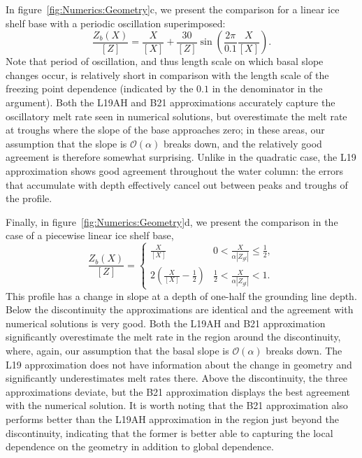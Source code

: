 \documentclass[openacc]{rsproca_new}%
\newcommand{\order}[1]{\mathcal{O}(#1)}
\begin{document}
In figure~\ref{fig:Numerics:Geometry}c, we present the comparison for a linear ice shelf base with a periodic oscillation superimposed:
\begin{equation}\label{E:Numerics:SinusoidalGeometry}
\frac{Z_b(X)}{\left[Z\right]}= \frac{X}{\left[X\right]} + \frac{30}{\left[Z\right]}\sin\left(\frac{2\pi}{0.1}\frac{ X}{\left[X\right]}\right).
\end{equation}
Note that period of oscillation, and thus length scale on which basal slope changes occur, is relatively short in comparison with the length scale of the freezing point dependence (indicated by the $0.1$ in the denominator in the argument). Both the L19AH and B21 approximations accurately capture the oscillatory melt rate seen in numerical solutions, but overestimate the melt rate at troughs where the slope of the base approaches zero; in these areas, our assumption that the slope is $\order{\alpha}$ breaks down, and the relatively good agreement is therefore somewhat surprising. Unlike in the quadratic case, the L19 approximation shows good agreement throughout the water column: the errors that accumulate with depth effectively cancel out between peaks and troughs of the profile.  

Finally, in figure~\ref{fig:Numerics:Geometry}d, we present the comparison in the case of a piecewise linear ice shelf base,
\begin{equation}\label{E:Numerics:PiecewiseGeometry}
\frac{Z_b(X)}{\left[Z\right]} = \begin{cases}
  \frac{X}{\left[X\right]}  & 0 <   \frac{X}{\alpha |Z_{gl}|} \leq   \frac{1}{2},\\
   2 \left(\frac{X}{\left[X\right]} -\frac{1}{2}\right)  &  \frac{1}{2} <   \frac{X}{\alpha |Z_{gl}|} <   1.
    \end{cases}
\end{equation}
This profile has a change in slope at a depth of one-half the grounding line depth. Below the discontinuity the approximations are identical and the agreement with numerical solutions is very good. Both the L19AH and B21 approximation significantly overestimate the melt rate in the region around the discontinuity, where, again, our assumption that the basal slope is $\order{\alpha}$ breaks down. The L19 approximation does not have information about the change in geometry and significantly underestimates melt rates there. Above the discontinuity, the three approximations deviate, but the B21 approximation displays the best agreement with the numerical solution. It is worth noting that the B21 approximation also performs better than the L19AH approximation in the region just beyond the discontinuity, indicating that the former is better able to capturing the local dependence on the geometry in addition to global dependence. 
\end{document}
